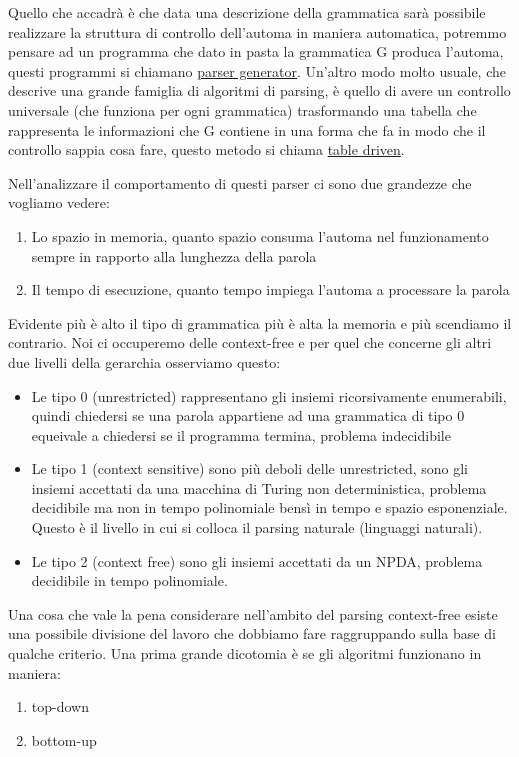 Quello che accadrà è che data una descrizione della grammatica sarà possibile realizzare la struttura di controllo dell'automa in maniera automatica, potremmo pensare ad un programma che dato in pasta la grammatica G produca l'automa, questi programmi si chiamano \underline{parser generator}.
Un'altro modo molto usuale, che descrive una grande famiglia di algoritmi di parsing, è quello di avere un controllo universale (che funziona per ogni grammatica) trasformando una tabella che rappresenta le informazioni che G contiene in una forma che fa in modo che il controllo sappia cosa fare, questo metodo si chiama \underline{table driven}.

Nell'analizzare il comportamento di questi parser ci sono due grandezze che vogliamo vedere:
\begin{enumerate}
    \item Lo spazio in memoria, quanto spazio consuma l'automa nel funzionamento sempre in rapporto alla lunghezza della parola
    \item Il tempo di esecuzione, quanto tempo impiega l'automa a processare la parola
\end{enumerate}

Evidente più è alto il tipo di grammatica più è alta la memoria e più scendiamo il contrario.
Noi ci occuperemo delle context-free e per quel che concerne gli altri due livelli della gerarchia osserviamo questo:
\begin{itemize}
    \item Le tipo 0 (unrestricted) rappresentano gli insiemi ricorsivamente enumerabili, quindi chiedersi se una parola appartiene ad una grammatica di tipo 0 equeivale a chiedersi se il programma termina, problema indecidibile
    \item Le tipo 1 (context sensitive) sono più deboli delle unrestricted, sono gli insiemi accettati da una macchina di Turing non deterministica, problema decidibile ma non in tempo polinomiale bensì in tempo e spazio esponenziale. Questo è il livello in cui si colloca il parsing naturale (linguaggi naturali).
    \item Le tipo 2 (context free) sono gli insiemi accettati da un NPDA, problema decidibile in tempo polinomiale.
\end{itemize}

Una cosa che vale la pena considerare nell'ambito del parsing context-free esiste una possibile divisione del lavoro che dobbiamo fare raggruppando sulla base di qualche criterio. Una prima grande dicotomia è se gli algoritmi funzionano in maniera:
\begin{enumerate}
    \item top-down
    \item bottom-up
\end{enumerate}

